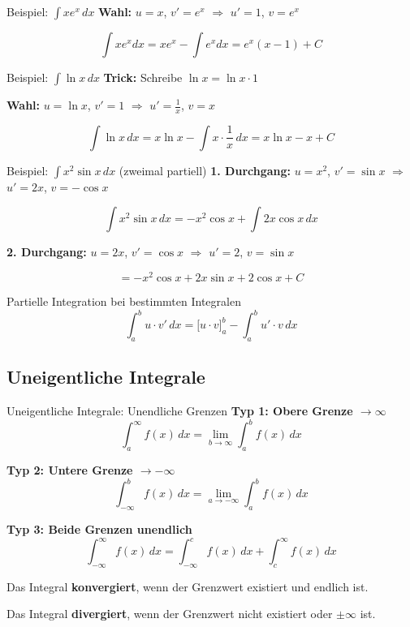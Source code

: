 \documentclass[a4paper,fontsize = 7pt]{scrartcl}
\begin{document}
\begin{subbox}{Beispiel: $\int x e^x\,dx$}
\textbf{Wahl:} $u = x$, $v' = e^x$ $\Rightarrow$ $u' = 1$, $v = e^x$

$$\int x e^x dx = x e^x - \int e^x dx = e^x(x - 1) + C$$
\end{subbox}

\begin{subbox}{Beispiel: $\int \ln x\,dx$}
\textbf{Trick:} Schreibe $\ln x = \ln x \cdot 1$

\textbf{Wahl:} $u = \ln x$, $v' = 1$ $\Rightarrow$ $u' = \frac{1}{x}$, $v = x$

$$\int \ln x\,dx = x \ln x - \int x \cdot \frac{1}{x}\,dx = x \ln x - x + C$$
\end{subbox}

\begin{subbox}{Beispiel: $\int x^2 \sin x\,dx$ (zweimal partiell)}
\textbf{1. Durchgang:} $u = x^2$, $v' = \sin x$ $\Rightarrow$ $u' = 2x$, $v = -\cos x$

$$\int x^2 \sin x\,dx = -x^2 \cos x + \int 2x \cos x\,dx$$

\textbf{2. Durchgang:} $u = 2x$, $v' = \cos x$ $\Rightarrow$ $u' = 2$, $v = \sin x$

$$= -x^2 \cos x + 2x \sin x + 2\cos x + C$$
\end{subbox}

\begin{mainbox}{Partielle Integration bei bestimmten Integralen}
$$\boxed{\int_a^b u \cdot v'\,dx = \Big[u \cdot v\Big]_a^b - \int_a^b u' \cdot v\,dx}$$
\end{mainbox}

\subsection{Uneigentliche Integrale}

\begin{mainbox}{Uneigentliche Integrale: Unendliche Grenzen}
\textbf{Typ 1: Obere Grenze $\to \infty$}
$$\int_a^{\infty} f(x)\,dx = \lim_{b \to \infty} \int_a^b f(x)\,dx$$

\textbf{Typ 2: Untere Grenze $\to -\infty$}
$$\int_{-\infty}^{b} f(x)\,dx = \lim_{a \to -\infty} \int_a^b f(x)\,dx$$

\textbf{Typ 3: Beide Grenzen unendlich}
$$\int_{-\infty}^{\infty} f(x)\,dx = \int_{-\infty}^{c} f(x)\,dx + \int_c^{\infty} f(x)\,dx$$

Das Integral \textbf{konvergiert}, wenn der Grenzwert existiert und endlich ist.

Das Integral \textbf{divergiert}, wenn der Grenzwert nicht existiert oder $\pm\infty$ ist.
\end{mainbox}
\end{document}
